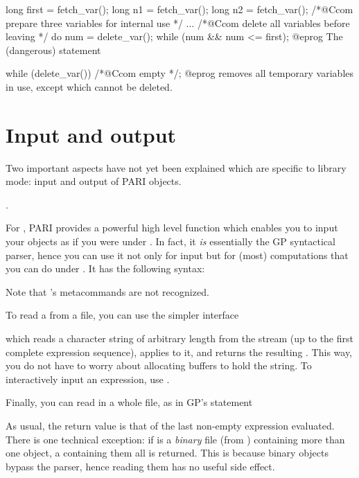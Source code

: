 \bprog
  long first = fetch_var();
  long n1 = fetch_var();
  long n2 = fetch_var(); /*@Ccom prepare three variables for internal use */
  ...
  /*@Ccom delete all variables before leaving */
  do { num = delete_var(); } while (num && num <= first);
@eprog\noindent
The (dangerous) statement

\bprog
  while (delete_var()) /*@Ccom empty */;
@eprog\noindent
removes all temporary variables in use, except  which cannot be
deleted.

\section{Input and output}

\noindent
Two important aspects have not yet been explained which are specific to
library mode: input and output of PARI objects.

.

\noindent
For , PARI provides a powerful high level function
which enables you to input your objects as if you were under . In fact,
it \emph{is} essentially the GP syntactical parser, hence you can use it not
only for input but for (most) computations that you can do under .
It has the following syntax:\label{se:gp_read_str}


\noindent
Note that 's metacommands are not recognized.

To read a  from a file, you can use the simpler interface


\noindent which reads a character string of arbitrary length from the stream
 (up to the first complete expression sequence), applies
 to it, and returns the resulting . This way, you
do not have to worry about allocating buffers to hold the string. To
interactively input an expression, use .

Finally, you can read in a whole file, as in GP's  statement


\noindent As usual, the return value is that of the last non-empty expression
evaluated. There is one technical exception: if  is a \emph{binary}
file (from ) containing more than one object, a 
containing them all is returned. This is because binary objects bypass the
parser, hence reading them has no useful side effect.

